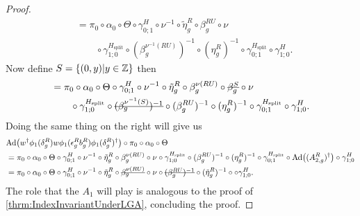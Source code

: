 \documentclass[12pt,a4paper,twoside]{article}
\numberwithin{equation}{section}
\begin{document}
\begin{proof}
\begin{align}
		&=\pi_0\circ\alpha_0\circ\Theta\circ\gamma^H_{0;1}\circ\nu^{-1}\circ\tilde\eta_g^R\circ\beta_g^{RU}\circ\nu\\
		\nonumber
		&\qquad \circ\gamma^{H_\text{split}}_{1;0}\circ(\beta_g^{\nu^{-1}(RU)})^{-1}\circ(\eta_g^R)^{-1}\circ\gamma^{H_{\text{split}}}_{0;1}\circ\gamma^{H}_{1;0}.
	\end{align}
	Now define $S=\{(0,y)|y\in\mathbb Z\}$ then
	\begin{align}
		&=\pi_0\circ\alpha_0\circ\Theta\circ\gamma^H_{0;1}\circ\nu^{-1}\circ\tilde\eta_g^R\circ\beta_g^{\nu(RU)}\circ\stkout{\beta_g^S}\circ\nu\\
		\nonumber
		&\qquad \circ\gamma^{H_\text{split}}_{1;0}\circ\stkout{(\beta_g^{\nu^{-1}(S)})^{-1}}\circ(\beta_g^{RU})^{-1}\circ(\eta_g^R)^{-1}\circ\gamma^{H_{\text{split}}}_{0;1}\circ\gamma^{H}_{1;0}.
	\end{align}
	Doing the same thing on the right will give us
	\begin{align}
		&\Ad{w^\dagger\phi_1(\delta_g^R)w\phi_1(\epsilon_g^R b_g^R)\phi_1(\delta_g^R)^\dagger}\circ\pi_0\circ\alpha_0\circ\Theta\\
		&=\pi_0\circ\alpha_0\circ\Theta\circ\gamma^H_{0;1}\circ\nu^{-1}\circ\tilde\eta_g^R\circ\beta_g^{\nu(RU)}\circ\nu\circ\gamma^{H_\text{split}}_{1;0}\circ(\beta_g^{RU})^{-1}\circ(\eta_g^R)^{-1}\circ\gamma^{H_{\text{split}}}_{0;1}\circ\Ad{(A_{2,g}^R)^\dagger}\circ\gamma^{H}_{1;0}\\
		&=\pi_0\circ\alpha_0\circ\Theta\circ\gamma^H_{0;1}\circ\nu^{-1}\circ\tilde\eta_g^R\circ\stkout{\beta_g^{\nu(RU)}}\circ\nu\circ\stkout{(\beta_g^{RU})^{-1}}\circ(\tilde\eta_g^R)^{-1}\circ\circ\gamma^{H}_{1;0}.
	\end{align}
	The role that the $A_1$ will play is analogous to the proof of \ref{thrm:IndexInvariantUnderLGA}, concluding the proof.
\end{proof}
\end{document}

